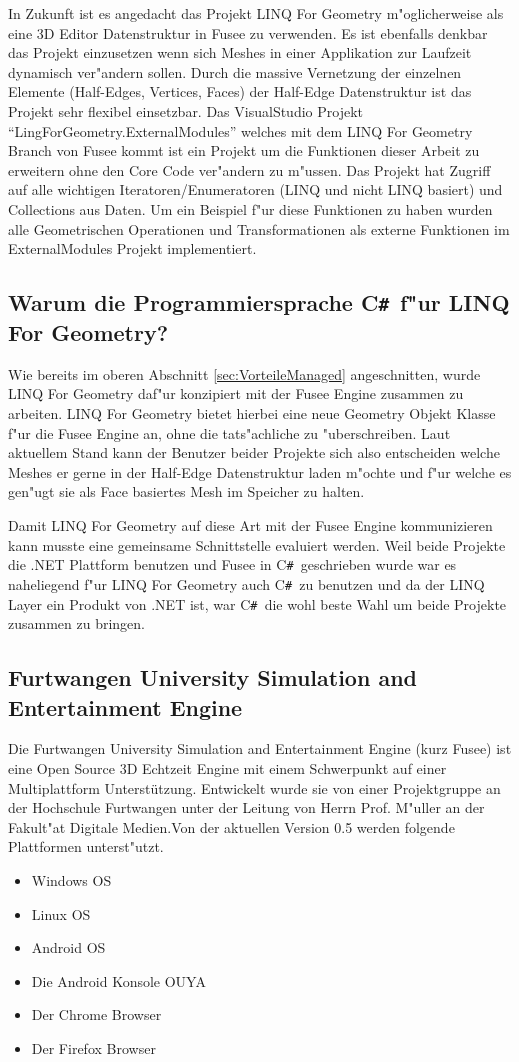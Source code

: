 \documentclass[pagesize, paper=a4, fontsize=12pt,titlepage=true, headings=small, headnosepline, abstractoff, liststotoc, nochapterprefix, plainheadsepline]{scrreprt}
\newcommand{\CSS}{C\texttt{\# }}
\newcommand{\LFG}{LINQ For Geometry}
\newcommand{\LFGS}{LINQ For Geometry }
\newcommand{\HES}{Half-Edge Datenstruktur }
\begin{document}
In Zukunft ist es angedacht das Projekt \LFGS m"oglicherweise als eine 3D Editor Datenstruktur in Fusee zu verwenden. Es ist ebenfalls denkbar das Projekt einzusetzen wenn sich Meshes in einer Applikation zur Laufzeit dynamisch ver"andern sollen. Durch die massive Vernetzung der einzelnen Elemente (Half-Edges, Vertices, Faces) der \HES ist das Projekt sehr flexibel einsetzbar. Das VisualStudio Projekt "`LingForGeometry.ExternalModules"' welches mit dem \LFGS Branch von Fusee kommt ist ein Projekt um die Funktionen dieser Arbeit zu erweitern ohne den Core Code ver"andern zu m"ussen. Das Projekt hat Zugriff auf alle wichtigen Iteratoren/Enumeratoren (LINQ und nicht LINQ basiert) und Collections aus Daten. Um ein Beispiel f"ur diese Funktionen zu haben wurden alle Geometrischen Operationen und Transformationen als externe Funktionen im ExternalModules Projekt implementiert.
		\subsection {Warum die Programmiersprache \CSS f"ur \LFG?}
			Wie bereits  im oberen Abschnitt \ref{sec:VorteileManaged} angeschnitten, wurde \LFGS daf"ur konzipiert mit der Fusee Engine zusammen zu arbeiten. \LFGS bietet hierbei eine neue Geometry Objekt Klasse f"ur die Fusee Engine an, ohne die tats"achliche zu "uberschreiben. Laut aktuellem Stand kann der Benutzer beider Projekte sich also entscheiden welche Meshes er gerne in der \HES laden m"ochte und f"ur welche es gen"ugt sie als Face basiertes Mesh im Speicher zu halten.

Damit \LFGS auf diese Art mit der Fusee Engine kommunizieren kann musste eine gemeinsame Schnittstelle evaluiert werden. Weil beide Projekte die .NET Plattform benutzen und Fusee in \CSS geschrieben wurde war es naheliegend f"ur \LFGS auch \CSS zu benutzen und da der LINQ Layer ein Produkt von .NET ist, war \CSS die wohl beste Wahl um beide Projekte zusammen zu bringen.
		\subsection {Furtwangen University Simulation and Entertainment Engine}
			Die Furtwangen University Simulation and Entertainment Engine (kurz Fusee) ist eine Open Source 3D Echtzeit Engine mit einem Schwerpunkt auf einer Multiplattform Unterstützung. Entwickelt wurde sie von einer Projektgruppe an der Hochschule Furtwangen unter der Leitung von Herrn Prof. M"uller an der Fakult"at Digitale Medien.Von der aktuellen Version 0.5 werden folgende Plattformen unterst"utzt.
\begin{itemize}
\item Windows OS
\item Linux OS
\item Android OS
\item Die Android Konsole OUYA
\item Der Chrome Browser
\item Der Firefox Browser
\end{itemize}
\end{document}
